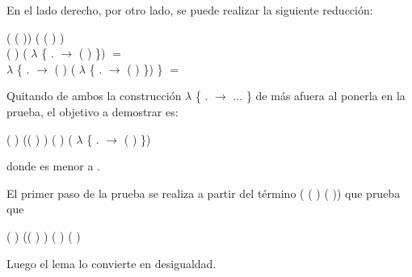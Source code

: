 \begin{AgdaAlign}
En el lado derecho, por otro lado, se puede realizar la siguiente reducción:
\begin{flushright}
(  ( )) \AgdaFunction{+} ( ( ) ) \\
( ) \AgdaFunction{+} ( $\lambda$ \{ . $\rightarrow$  ( )  \}) $=$ \\
 $\lambda$ \{ . $\rightarrow$ ( ) \AgdaFunction{+} ( $\lambda$ \{ . $\rightarrow$  ( )  \}) \} $=$
\end{flushright}

Quitando de ambos la construcción  $\lambda$ \{ . $\rightarrow$ ... \} de más afuera al ponerla en la prueba, el objetivo a demostrar es: 
\begin{center}
\AgdaFunction{[}  \AgdaFunction{]}  ( ) (( ) \AgdaFunction{+} ) \AgdaFunction{$\leq$} ( ) \AgdaFunction{+} ( $\lambda$ \{ . $\rightarrow$  ( )  \})
\end{center}
donde  es menor a .

El primer paso de la prueba se realiza a partir del término ( ( )   ( )) que prueba que 
\begin{center}
\AgdaFunction{[}  \AgdaFunction{]}  ( ) (( ) \AgdaFunction{+} ) \AgdaFunction{$\sim$}  ( ) ( ) 
\end{center}
Luego el lema \AgdaFunction{$\sim\rightarrow\leq$} lo convierte en desigualdad. 


\end{AgdaAlign}
